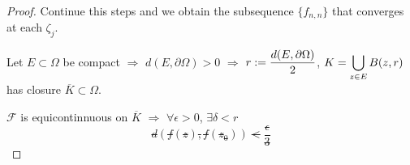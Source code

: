 \begin{proof}
    Continue this steps and we obtain  the subsequence  $ \{f_{n,n}\} $ that converges at each  $ \zeta_j $.
    
    Let  $ E\subset \Omega  $ be compact  $ \Rightarrow  $  $ d(E,\partial \Omega)>0 $ $ \Rightarrow  $  $ r:=\displaystyle\frac{d(E,\partial \Omega)}{2} $,  $ K=\displaystyle\bigcup_{z\in E}B(z,r) $ has closure  $ \overline{K}\subset \Omega $.
    
     $ \mathscr{F} $ is equicontinnuous on  $ \overline{K} $ $ \Rightarrow $  $ \forall \epsilon>0 $,  $ \exists \delta<r $ \st   
     \[d(f(z),f(z_0))<\frac{\epsilon}{3}\] 
\end{proof}